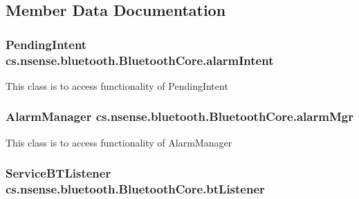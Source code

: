 \subsection{Member Data Documentation}
\hypertarget{classcs_1_1nsense_1_1bluetooth_1_1_bluetooth_core_a65deac543c05e4a15e85874dced0758d}{
\subsubsection[{alarm\-Intent}]{\setlength{\rightskip}{0pt plus 5cm}Pending\-Intent cs.\-nsense.\-bluetooth.\-Bluetooth\-Core.\-alarm\-Intent\hspace{0.3cm}{\ttfamily [private]}}}\label{classcs_1_1nsense_1_1bluetooth_1_1_bluetooth_core_a65deac543c05e4a15e85874dced0758d}
This class is to access functionality of Pending\-Intent \hypertarget{classcs_1_1nsense_1_1bluetooth_1_1_bluetooth_core_a07755d36841e588eb581696414248601}{
\subsubsection[{alarm\-Mgr}]{\setlength{\rightskip}{0pt plus 5cm}Alarm\-Manager cs.\-nsense.\-bluetooth.\-Bluetooth\-Core.\-alarm\-Mgr\hspace{0.3cm}{\ttfamily [private]}}}\label{classcs_1_1nsense_1_1bluetooth_1_1_bluetooth_core_a07755d36841e588eb581696414248601}
This class is to access functionality of Alarm\-Manager \hypertarget{classcs_1_1nsense_1_1bluetooth_1_1_bluetooth_core_a7443dfc52b72fb90380a5bc552dc972a}{
\subsubsection[{bt\-Listener}]{\setlength{\rightskip}{0pt plus 5cm}Service\-B\-T\-Listener cs.\-nsense.\-bluetooth.\-Bluetooth\-Core.\-bt\-Listener\hspace{0.3cm}{\ttfamily [private]}}}\label{classcs_1_1nsense_1_1bluetooth_1_1_bluetooth_core_a7443dfc52b72fb90380a5bc552dc972a}
